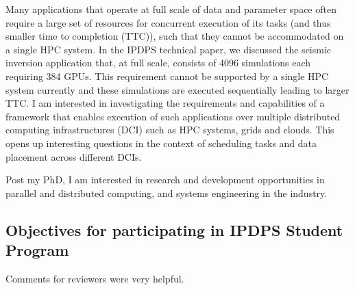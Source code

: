 Many applications that operate at full scale of data and parameter space often
require a large set of resources for concurrent execution of its tasks (and thus
smaller time to completion (TTC)), such that they cannot be accommodated on a 
single HPC system. In the IPDPS technical paper, we discussed the seismic 
inversion application that, at full scale, consists of 4096 simulations each 
requiring 384 GPUs. This requirement cannot be supported by a single HPC system 
currently and these simulations are executed sequentially leading to larger TTC. 
I am interested in investigating the requirements and capabilities of a framework 
that enables execution of such applications over multiple distributed computing 
infrastructures (DCI) such as HPC systems, grids and clouds. This opens up 
interesting questions in the context of scheduling tasks and data placement 
across different DCIs.

Post my PhD, I am interested in research and development opportunities in 
parallel and distributed computing, and systems engineering in the industry.


\subsection{Objectives for participating in IPDPS Student Program}


Comments for reviewers were very helpful.